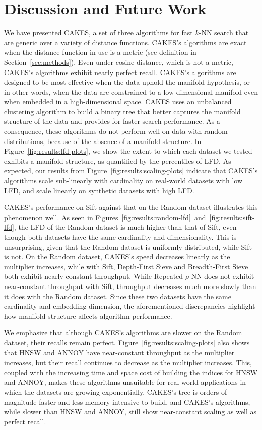 \section{Discussion and Future Work}
\label{sec:discussion-and-future-work}

We have presented CAKES, a set of three algorithms for fast $k$-NN search that are generic over a variety of distance functions.
CAKES's algorithms are exact when the distance function in use is a metric (see definition in Section~\ref{sec:methods}).
Even under cosine distance, which is not a metric, CAKES's algorithms exhibit nearly perfect recall.
CAKES's algorithms are designed to be most effective when the data uphold the manifold hypothesis, or in other words, when the data are constrained to a low-dimensional manifold even when embedded in a high-dimensional space.
CAKES uses an unbalanced clustering algorithm to build a binary tree that better captures the manifold structure of the data and provides for faster search performance.
As a consequence, these algorithms do not perform well on data with random distributions, because of the absence of a manifold structure.
In Figure~\ref{fig:results:lfd-plots}, we show the extent to which each dataset we tested exhibits a manifold structure, as quantified by the percentiles of LFD.
As expected, our results from Figure~\ref{fig:results:scaling-plots} indicate that CAKES's algorithms scale sub-linearly with cardinality on real-world datasets with low LFD, and scale linearly on synthetic datasets with high LFD.

CAKES's performance on Sift against that on the Random dataset illustrates this phenomenon well.
As seen in Figures~\ref{fig:results:random-lfd}~and~\ref{fig:results:sift-lfd}, the LFD of the Random dataset is much higher than that of Sift, even though both datasets have the same cardinality and dimensionality.
This is unsurprising, given that the Random dataset is uniformly distributed, while Sift is not.
On the Random dataset, CAKES's speed decreases linearly as the multiplier increases, while with Sift, Depth-First Sieve and Breadth-First Sieve both exhibit nearly constant throughput.
While Repeated $\rho$-NN does not exhibit near-constant throughput with Sift, throughput decreases much more slowly than it does with the Random dataset.
Since these two datasets have the same cardinality and embedding dimension, the aforementioned discrepancies highlight how manifold structure affects algorithm performance.

We emphasize that although CAKES's algorithms are slower on the Random dataset, their recalls remain perfect.
Figure~\ref{fig:results:scaling-plots} also shows that HNSW and ANNOY have near-constant throughput as the multiplier increases, but their recall continues to decrease as the multiplier increases.
This, coupled with the increasing time and space cost of building the indices for HNSW and ANNOY, makes these algorithms unsuitable for real-world applications in which the datasets are growing exponentially.
CAKES's tree is orders of magnitude faster and less memory-intensive to build, and CAKES's algorithms, while slower than HNSW and ANNOY, still show near-constant scaling as well as perfect recall.

